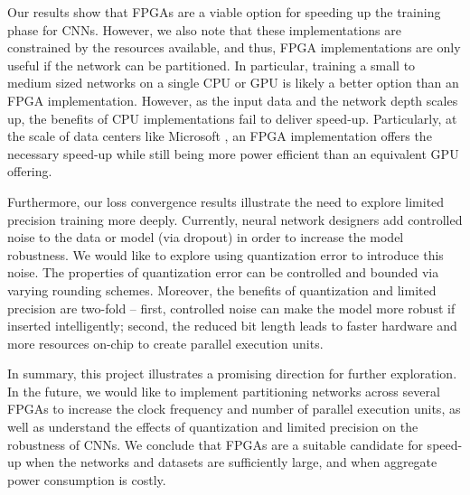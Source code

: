 Our results show that FPGAs are a viable option for speeding up the training phase for CNNs. However, we also note that these implementations are constrained by the resources available, and thus, FPGA implementations are only useful if the network can be partitioned. In particular, training a small to medium sized networks on a single CPU or GPU is likely a better option than an FPGA implementation. However, as the input data and the network depth scales up, the benefits of CPU implementations fail to deliver speed-up. Particularly, at the scale of data centers like Microsoft \cite{project-catapult}, an FPGA implementation offers the necessary speed-up while still being more power efficient than an equivalent GPU offering.

Furthermore, our loss convergence results illustrate the need to explore limited precision training more deeply. Currently, neural network designers add controlled noise to the data or model (via dropout) in order to increase the model robustness. We would like to explore using quantization error to introduce this noise. The properties of quantization error can be controlled and bounded via varying rounding schemes. Moreover, the benefits of quantization and limited precision are two-fold -- first, controlled noise can make the model more robust if inserted intelligently; second, the reduced bit length leads to faster hardware and more resources on-chip to create parallel execution units.

In summary, this project illustrates a promising direction for further exploration. In the future, we would like to implement partitioning networks across several FPGAs to increase the clock frequency and number of parallel execution units, as well as understand the effects of quantization and limited precision on the robustness of CNNs. We conclude that FPGAs are a suitable candidate for speed-up when the networks and datasets are sufficiently large, and when aggregate power consumption is costly.